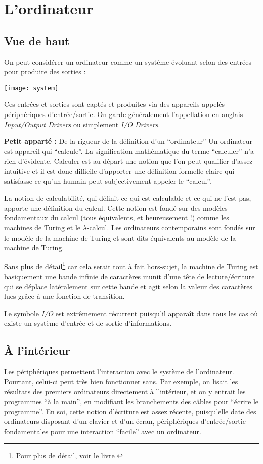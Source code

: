 \documentclass[../../main.tex]{subfiles}
\begin{document}
\section{L'ordinateur}
\subsection{Vue de haut}
On peut considérer un ordinateur comme un système évoluant selon des entrées pour produire des sorties :
\begin{center}
  \texttt{[image: system]}
\end{center}
Ces entrées et sorties sont captés et produites via des appareils appelés périphériques d'entrée/sortie. On garde généralement l'appellation en anglais \textit{\underline{I}nput/\underline{O}utput Drivers} ou simplement \textit{\underline{I}/\underline{O} Drivers}.

\begin{minitelbasicbox}{\textbf{Petit apparté :} De la rigueur de la définition d'un ``ordinateur''}
Un ordinateur est appareil qui ``calcule''. La signification mathématique du terme ``calculer'' n'a
rien d'évidente. Calculer est au départ une notion que l'on peut qualifier d'assez intuitive et il
est donc difficile d'apporter une définition formelle claire qui satisfasse ce qu'un humain peut
subjectivement appeler le ``calcul''.

La notion de calculabilité, qui définit ce qui est calculable et ce qui ne l'est pas, apporte une
définition du calcul. Cette notion est fondé sur des modèles fondamentaux du calcul (tous
équivalents, et heureusement !) comme les machines de Turing et le $\lambda$-calcul. Les ordinateurs
contemporains sont fondés sur le modèle de la machine de Turing et sont dits équivalents au
modèle de la machine de Turing.

Sans plus de détail\footnote{Pour plus de détail, voir le livre \cite{XFI}} car cela serait tout à fait hors-sujet, la machine de Turing est basiquement une bande infinie de caractères munit d'une tête de lecture/écriture qui se déplace latéralement
sur cette bande et agit selon la valeur des caractères lues grâce à une fonction de transition.
\end{minitelbasicbox}
Le symbole \textit{I/O} est extrêmement récurrent puisqu'il apparaît dans tous les cas où existe un système d'entrée et de sortie d'informations.
\subsection{À l'intérieur}
Les périphériques permettent l'interaction avec le système de l'ordinateur. Pourtant, celui-ci peut très bien fonctionner sans. Par exemple, on lisait les résultats des premiers ordinateurs directement à l'intérieur, et on y entrait les programmes ``à la main'', en modifiant les branchements des câbles pour ``écrire le programme''. En soi, cette notion d'écriture est assez récente, puisqu'elle date des ordinateurs disposant d'un clavier et d'un écran, périphériques d'entrée/sortie fondamentales pour une interaction ``facile'' avec un ordinateur.
\end{document}
